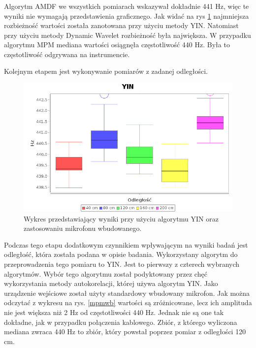 Algorytm AMDF we wszystkich pomiarach wskazywał dokładnie 441 Hz, więc te wyniki nie wymagają przedstawienia graficznego. Jak widać na rys \ref{yinwb} najmniejsza rozbieżność wartości została zanotowana przy użyciu metody YIN. Natomiast przy użyciu metody Dynamic Wavelet rozbieżność była największa. W przypadku algorytmu MPM mediana wartości osiągnęła częstotliwość 440 Hz. Była to częstotliwość odgrywana na instrumencie.
 
Kolejnym etapem jest wykonywanie pomiarów z zadanej odległości.


\begin{figure}[h!]
  \centering
  \includegraphics[width=0.9\linewidth]{rys/BoxPlots/YIN_mic_wb}
  \caption{Wykres przedstawiający wyniki przy użyciu algorytmu YIN oraz zastosowaniu mikrofonu wbudowanego.}
  \label{yinwb}
\end{figure}


Podczas tego etapu dodatkowym czynnikiem wpływającym na wyniki badań jest odległość, która została podana w opisie badania. Wykorzystany algorytm do przeprowadzenia tego pomiaru to YIN. Jest to pierwszy z czterech wybranych algorytmów. Wybór tego algorytmu został podyktowany przez chęć wykorzystania metody autokorelacji, której używa algorytm YIN. Jako urządzenie wejściowe został użyty standardowy wbudowany mikrofon. Jak można odczytać z wykresu na rys. \ref{mpmwb} wartości są zróżnicowane, lecz ich amplituda nie jest większa niż 2 Hz od częstotliwości 440 Hz. Jednak nie są one tak dokładne, jak w przypadku połączenia kablowego. Zbiór, z którego wyliczona mediana zwraca 440 Hz to zbiór, który powstał poprzez pomiar z odległości 120 cm.


